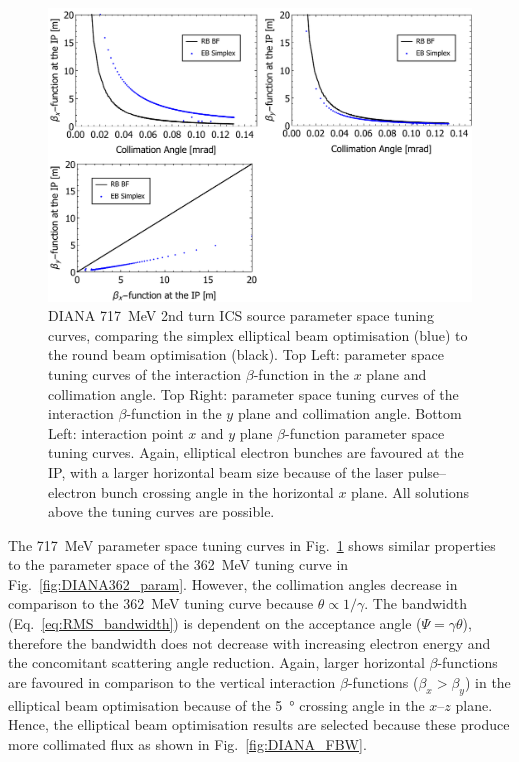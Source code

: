 \documentclass[../main.tex]{subfiles}
\begin{document}
\begin{figure}[!h]
\centering
\includegraphics[width=\textwidth]{Figures/DIANA_Inverse_Compton_Source_Design/DIANA717param.pdf}
\caption{DIANA 717~\si{\mega\electronvolt} 2nd turn ICS source parameter space tuning curves, comparing the simplex elliptical beam optimisation (blue) to the round beam optimisation (black). Top Left: parameter space tuning curves of the interaction $\beta$-function in the $x$ plane and collimation angle. Top Right: parameter space tuning curves of the interaction $\beta$-function in the $y$ plane and collimation angle. Bottom Left: interaction point $x$ and $y$ plane $\beta$-function parameter space tuning curves. Again, elliptical electron bunches are favoured at the IP, with a larger horizontal beam size because of the laser pulse--electron bunch crossing angle in the horizontal $x$ plane. All solutions above the tuning curves are possible.}
\label{fig:DIANA717_param}
\end{figure}
The 717~\si{\mega\electronvolt} parameter space tuning curves in Fig.~\ref{fig:DIANA717_param} shows similar properties to the parameter space of the 362~\si{\mega\electronvolt} tuning curve in Fig.~\ref{fig:DIANA362_param}. However, the collimation angles decrease in comparison to the 362~\si{\mega\electronvolt} tuning curve because $\theta \propto 1/\gamma$. The bandwidth (Eq.~\ref{eq:RMS_bandwidth}) is dependent on the acceptance angle ($\Psi=\gamma\theta$), therefore the bandwidth does not decrease with increasing electron energy and the concomitant scattering angle reduction. Again, larger horizontal $\beta$-functions are favoured in comparison to the vertical interaction $\beta$-functions ($\beta_{x}>\beta_{y}$) in the elliptical beam optimisation because of the 5~\si{\degree} crossing angle in the $x$--$z$ plane. Hence, the elliptical beam optimisation results are selected because these produce more collimated flux as shown in Fig.~\ref{fig:DIANA_FBW}. 
\end{document}
